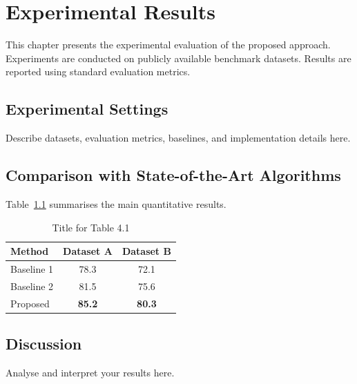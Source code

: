 \chapter{Experimental Results}
\label{chap:results}

This chapter presents the experimental evaluation of the proposed
approach. Experiments are conducted on publicly available benchmark
datasets. Results are reported using standard evaluation metrics.

\section{Experimental Settings}
\label{sec:exp_settings}

Describe datasets, evaluation metrics, baselines, and implementation
details here.

\section{Comparison with State-of-the-Art Algorithms}
\label{sec:comparison}

Table~\ref{tab:results} summarises the main quantitative results.

\begin{table}[ht]
  \caption{Title for Table 4.1}
  \label{tab:results}
  \centering
  \begin{singlespace}
  \begin{tabular}{lcc}
    \toprule
    \textbf{Method} & \textbf{Dataset A} & \textbf{Dataset B} \\
    \midrule
    Baseline 1      & 78.3             & 72.1 \\
    Baseline 2      & 81.5             & 75.6 \\
    Proposed        & \textbf{85.2}    & \textbf{80.3} \\
    \bottomrule
  \end{tabular}
  \end{singlespace}
\end{table}

\section{Discussion}
\label{sec:discussion}

Analyse and interpret your results here.
